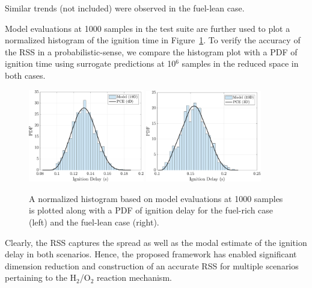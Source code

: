 Similar trends (not included) were observed in the fuel-lean case. 

Model evaluations at 1000 samples in the test suite
are further used to plot a normalized histogram of the ignition time in 
Figure~\ref{fig:pdf_kinetics}. To verify the accuracy of the RSS in a 
probabilistic-sense, we compare the histogram plot with a PDF of ignition time
using surrogate predictions at 10$^{6}$ samples in the reduced space in both cases. 
%
\begin{figure}[htbp]
 \begin{center}
  \includegraphics[width=0.45\textwidth]{./Figures/pdf_comp_rich}
  \includegraphics[width=0.45\textwidth]{./Figures/pdf_comp_lean}
\caption{A normalized histogram based on model evaluations at 1000 samples is plotted
along with a PDF of ignition delay for the fuel-rich case (left) and the fuel-lean
case (right).}
\label{fig:pdf_kinetics}
\end{center}
\end{figure}
%
Clearly, the RSS captures the spread as well as the modal estimate of
the ignition delay in both scenarios. Hence, the proposed framework 
has enabled significant dimension reduction and construction of an accurate
RSS for multiple scenarios pertaining to the H$_2$/O$_2$ reaction
mechanism.    

